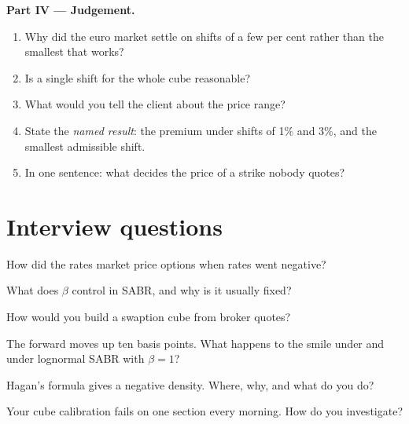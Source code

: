 \begin{problem}
\medskip\noindent\textbf{Part IV --- Judgement.}
\begin{enumerate}[resume]
\item Why did the euro market settle on shifts of a few per cent rather than
the smallest that works?
\item Is a single shift for the whole cube reasonable?
\item What would you tell the client about the price range?
\item State the \emph{named result}: the premium under shifts of 1\% and 3\%, and
the smallest admissible shift.
\item In one sentence: what decides the price of a strike nobody quotes?
\end{enumerate}
\end{problem}

\section{Interview questions}

\begin{interviewq}\label{iq:rc:sabr-in-rates-and-the-volatility-cube:1}
How did the rates market price options when rates went negative?
\end{interviewq}

\begin{interviewq}\label{iq:rc:sabr-in-rates-and-the-volatility-cube:2}
What does $\beta$ control in SABR, and why is it usually fixed?
\end{interviewq}

\begin{interviewq}\label{iq:rc:sabr-in-rates-and-the-volatility-cube:3}
How would you build a swaption cube from broker quotes?
\end{interviewq}

\begin{interviewq}\label{iq:rc:sabr-in-rates-and-the-volatility-cube:4}
The forward moves up ten basis points. What happens to the smile under  and under lognormal SABR with $\beta=1$?
\end{interviewq}

\begin{interviewq}\label{iq:rc:sabr-in-rates-and-the-volatility-cube:5}
Hagan's formula gives a negative density. Where, why, and what do you do?
\end{interviewq}

\begin{interviewq}\label{iq:rc:sabr-in-rates-and-the-volatility-cube:6}
Your cube calibration fails on one section every morning. How do you
investigate?
\end{interviewq}
